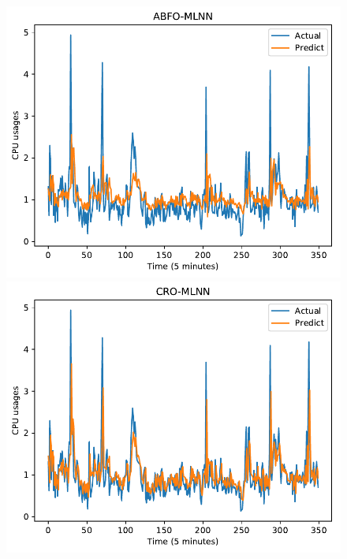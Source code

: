 \documentclass[11pt,twoside]{article}
\begin{document}
\begin{multicols}{2}
\begin{figure}[!ht]
    \begin{minipage}[b]{0.33\linewidth}
    \centering
    \includegraphics[width=0.9\linewidth]{predict/k2/cpu_k2_abfo_mlnn.pdf} 
  \end{minipage}
  \begin{minipage}[b]{0.33\linewidth}
    \centering
    \includegraphics[width=0.9\linewidth]{predict/k2/cpu_k2_cro_mlnn.pdf} 
  \end{minipage} 
  \begin{minipage}[b]{0.33\linewidth}
    \centering

\end{minipage}
\end{figure}
\end{multicols}
\end{document}
